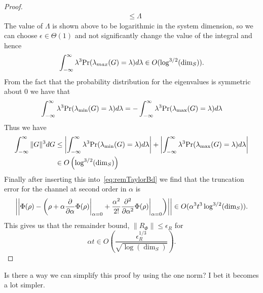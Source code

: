 \documentclass{article}
\newcommand{\norm}[1]{\left| \left| #1 \right| \right|}
\begin{document}
\begin{proof}
\begin{align}
    &\le \Lambda
\end{align}
The value of $\Lambda$ is shown above to be logarithmic in the system dimension, so we can choose $\epsilon \in \Theta(1)$ and not significantly change the value of the integral and hence
\begin{equation}
    \int_{-\infty}^\infty \lambda^3 {\rm Pr}(\lambda_{max}(G) = \lambda) d\lambda \in O(\log^{3/2}(\dim_S)).
\end{equation}
From the fact that the probability distribution for the eigenvalues is symmetric about $0$ we have that
\begin{equation}
    \int_{-\infty}^\infty \lambda^3 {\rm Pr}(\lambda_{\min}(G) = \lambda) d\lambda = - \int_{-\infty}^\infty \lambda^3 {\rm Pr}(\lambda_{\max}(G) = \lambda) d\lambda
\end{equation}
Thus we have 
\begin{align}
    \int_{-\infty}^\infty \|G\|^3 dG &\le \left|\int_{-\infty}^\infty \lambda^3 {\rm Pr}(\lambda_{\min}(G) = \lambda) d\lambda \right| + \left|\int_{-\infty}^\infty \lambda^3 {\rm Pr}(\lambda_{\max}(G) = \lambda) d\lambda \right|\nonumber\\
    &\in O\left(\log^{3/2}(\dim_S) \right)
\end{align}
Finally after inserting this into~\eqref{eq:remTaylorBd} we find that the truncation error for the channel at second order in $\alpha$ is
\begin{equation}
    \norm{\Phi(\rho) - \left(\rho + {\alpha} \frac{\partial}{\partial \alpha} \Phi(\rho) \bigg|_{\alpha = 0} + \frac{\alpha^2}{2!} \frac{\partial^2}{\partial \alpha^2} \Phi(\rho) \bigg|_{\alpha = 0} \right)} \in O(\alpha^3 t^3 \log^{3/2}({\rm dim}_S)).
\end{equation}
This gives us that the remainder bound, $\|R_\Phi\|\le \epsilon_R$ for 
\begin{equation}
    \alpha t \in O\left(\frac{\epsilon_R^{1/3}}{\sqrt{\log(\dim_S)}} \right).
\end{equation}
\end{proof}

Is there a way we can simplify this proof by using the one norm? I bet it becomes a lot simpler. 
\end{document}
